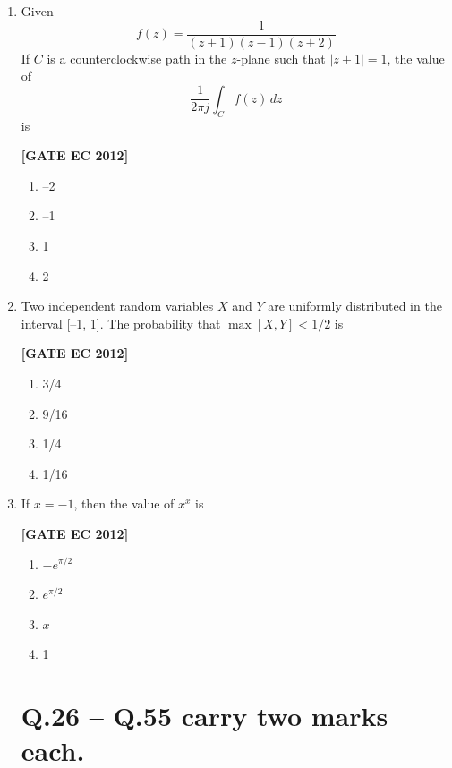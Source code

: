 \documentclass[12pt]{article}
\begin{document}
\begin{enumerate}[leftmargin=1.0em, label=\textbf{Q.\arabic*.}, itemsep=2em]
\item Given
\[
f(z) = \frac{1}{(z+1)(z-1)(z+2)}
\]
If $C$ is a counterclockwise path in the $z$-plane such that $|z+1|=1$, the value of
\[
\frac{1}{2\pi j} \int_C f(z) \, dz
\]
is

\noindent \textbf{[GATE EC 2012]}
\begin{multicols}{2}
    \begin{enumerate}
        \item –2
        \item –1
        \item 1
        \item 2
    \end{enumerate}
\end{multicols}

\item Two independent random variables $X$ and $Y$ are uniformly distributed in the interval [–1, 1]. The probability that $\max[X,Y] < 1/2$ is

\noindent \textbf{[GATE EC 2012]}
\begin{multicols}{2}
    \begin{enumerate}
        \item 3/4
        \item 9/16
        \item 1/4
        \item 1/16
    \end{enumerate}
\end{multicols}

\item If $x = -1$, then the value of $x^x$ is

\noindent \textbf{[GATE EC 2012]}
\begin{multicols}{2}
    \begin{enumerate}
        \item $-e^{\pi/2}$
        \item $e^{\pi/2}$
        \item $x$
        \item 1
    \end{enumerate}
\end{multicols}

\newpage
\section*{Q.26 -- Q.55 carry two marks each.}
\begin{enumerate}[leftmargin=2.5em, label=\textbf{Q.\arabic*.}, itemsep=2em, start=26]


\end{enumerate}
\end{enumerate}
\end{document}
